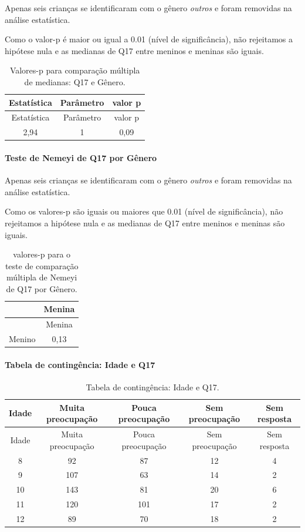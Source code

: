\documentclass[]{article}
\let\oldparagraph\paragraph
\renewcommand{\paragraph}[1]{\oldparagraph{#1}\mbox{}}
\begin{document}
Apenas seis crianças se identificaram com o gênero \emph{outros} e foram removidas na análise estatística.

Como o valor-p é maior ou igual a 0.01 (nível de significância), não rejeitamos a hipótese nula e as medianas de Q17 entre meninos e meninas são iguais.

\begin{longtable}[]{@{}ccc@{}}
\caption{\label{tab:unnamed-chunk-206}Valores-p para comparação múltipla de medianas: Q17 e Gênero.}\tabularnewline
\toprule
Estatística & Parâmetro & valor p\tabularnewline
\midrule
\endfirsthead
\toprule
Estatística & Parâmetro & valor p\tabularnewline
\midrule
\endhead
2,94 & 1 & 0,09\tabularnewline
\bottomrule
\end{longtable}

\hypertarget{teste-de-nemeyi-de-q17-por-guxeanero}{%
\paragraph{Teste de Nemeyi de Q17 por Gênero}\label{teste-de-nemeyi-de-q17-por-guxeanero}}

Apenas seis crianças se identificaram com o gênero \emph{outros} e foram removidas na análise estatística.

Como os valores-p são iguais ou maiores que 0.01 (nível de significância), não rejeitamos a hipótese nula e as medianas de Q17 entre meninos e meninas são iguais.

\begin{longtable}[]{@{}lc@{}}
\caption{\label{tab:unnamed-chunk-208}valores-p para o teste de comparação múltipla de Nemeyi de Q17 por Gênero.}\tabularnewline
\toprule
& Menina\tabularnewline
\midrule
\endfirsthead
\toprule
& Menina\tabularnewline
\midrule
\endhead
Menino & 0,13\tabularnewline
\bottomrule
\end{longtable}

\cleardoublepage

\hypertarget{tabela-de-continguxeancia-idade-e-q17}{%
\paragraph{Tabela de contingência: Idade e Q17}\label{tabela-de-continguxeancia-idade-e-q17}}

\begin{longtable}[]{@{}ccccc@{}}
\caption{\label{tab:unnamed-chunk-209}Tabela de contingência: Idade e Q17.}\tabularnewline
\toprule
Idade & Muita preocupação & Pouca preocupação & Sem preocupação & Sem resposta\tabularnewline
\midrule
\endfirsthead
\toprule
Idade & Muita preocupação & Pouca preocupação & Sem preocupação & Sem resposta\tabularnewline
\midrule
\endhead
8 & 92 & 87 & 12 & 4\tabularnewline
9 & 107 & 63 & 14 & 2\tabularnewline
10 & 143 & 81 & 20 & 6\tabularnewline
11 & 120 & 101 & 17 & 2\tabularnewline
12 & 89 & 70 & 18 & 2\tabularnewline
\bottomrule
\end{longtable}
\end{document}
